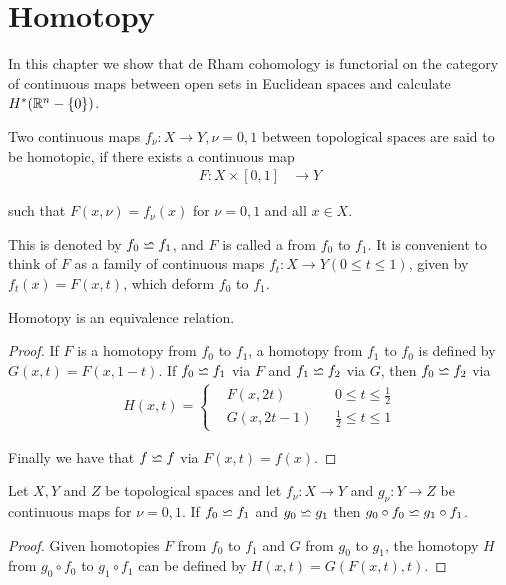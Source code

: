 \chapter{Homotopy}
In this chapter we show that de Rham cohomology is functorial on the category of continuous 
maps between open sets in Euclidean spaces and calculate $H^*(\mathbb{R}^n - \{0\})$.

\begin{definition}
  Two continuous maps $f_\nu:X\to Y, \nu = 0,1$ between topological
spaces are said to be homotopic, if there exists a continuous map
\begin{align*}
  F:X\times [0,1] &\to Y
\end{align*}

such that $F(x, \nu) = f_\nu(x)$ for $\nu=0, 1$ and all $x\in X$.
\end{definition}


This is denoted by $f_0\backsimeq f_1$, and $F$ is called a  from $f_0$ to $f_1$. It is 
convenient to think of $F$ as a family of continuous maps $f_t:X\to Y (0\le t\le 1)$, given by $f_t(x) = F(x, t)$, 
which deform $f_0$ to $f_1$.


\begin{lemma}\label{lemma:6-2}
  Homotopy is an equivalence relation.
\end{lemma}

\begin{proof}
  If $F$ is a homotopy from $f_0$ to $f_1$, a homotopy from $f_1$ to $f_0$ is defined by $G(x, t) = F(x, 1-t)$.
  If $f_0\backsimeq f_1$ via $F$ and $f_1\backsimeq f_2$ via $G$, then $f_0\backsimeq f_2$ via 
  \begin{align*}
    H(x, t) = \left\{\begin{aligned}
      & F(x, 2t) && 0\le t\le \frac12\\
      & G(x, 2t-1) && \frac12\le t\le 1
    \end{aligned}\right.
  \end{align*}

  Finally we have that $f\backsimeq f$ via $F(x, t) = f(x)$.
\end{proof}

\begin{lemma}\label{lemma:6-3}
Let $X, Y$ and $Z$ be topological spaces and let $f_\nu:X\to Y$ and $g_\nu:Y\to Z$ be continuous maps for $\nu=0, 1$. If 
$f_0 \backsimeq f_1$ and $g_0\backsimeq g_1$ then $g_0\circ f_0\backsimeq g_1\circ f_1$.
\end{lemma}

\begin{proof}
  Given homotopies $F$ from $f_0$ to $f_1$ and $G$ from $g_0$ to $g_1$, the homotopy $H$
  from $g_0\circ f_0$ to $g_1\circ f_1$ can be defined by $H(x, t) = G(F(x, t), t)$.
\end{proof}


